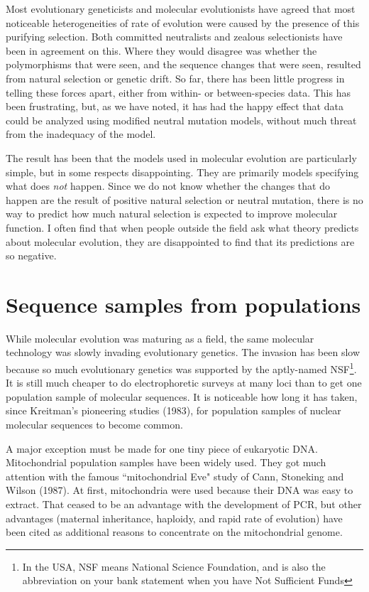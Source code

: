 \documentclass[12pt]{article}
\begin{document}
Most evolutionary geneticists and molecular evolutionists have agreed that
most noticeable heterogeneities of rate of evolution were caused by the
presence of this purifying selection.   Both committed neutralists and
zealous selectionists have been in agreement on this.  Where they would disagree
was whether the polymorphisms that were seen, and the sequence changes that
were seen, resulted from natural selection or genetic drift.  So far, there
has been little progress in telling these forces apart, either from
within- or between-species data.  This has been frustrating, but, as we
have noted, it has had the
happy effect that data could be analyzed using modified neutral mutation models,
without much threat from the inadequacy of the model.

The result has been that the models used in molecular evolution are
particularly simple, but in some respects disappointing.  They are primarily
models specifying  what does {\it not} happen.  Since we do not know
whether the changes that do happen are the result of positive natural
selection or neutral mutation, there is no way to predict how much natural
selection is expected to improve molecular function.   I often find that when
people outside the field ask what theory predicts about molecular evolution,
they are disappointed to find that its predictions are so negative.

\section*{Sequence samples from populations}

While molecular evolution was maturing as a field, the same molecular
technology was slowly invading evolutionary genetics.  The invasion has been
slow because so much evolutionary genetics was supported by the aptly-named
NSF\footnote{In the USA, NSF means National Science Foundation, and is also
 the abbreviation on your bank statement when you have Not Sufficient Funds}.  It is still much cheaper to do electrophoretic surveys at many
loci than to get one population sample of molecular sequences.  It is
noticeable how long it has taken, since Kreitman's pioneering studies (1983),
for population samples of nuclear molecular sequences to become common.

A major exception must be made for one tiny piece of eukaryotic DNA.
Mitochondrial population samples have been widely used.
They got much attention with the famous ``mitochondrial Eve" study of
Cann, Stoneking and Wilson (1987).   At first, mitochondria were used because their DNA was
easy to extract.  That ceased to be an advantage with the development of
PCR, but other advantages (maternal inheritance, haploidy, and rapid rate of
evolution) have been cited as additional reasons to concentrate on the mitochondrial
genome.
\end{document}
